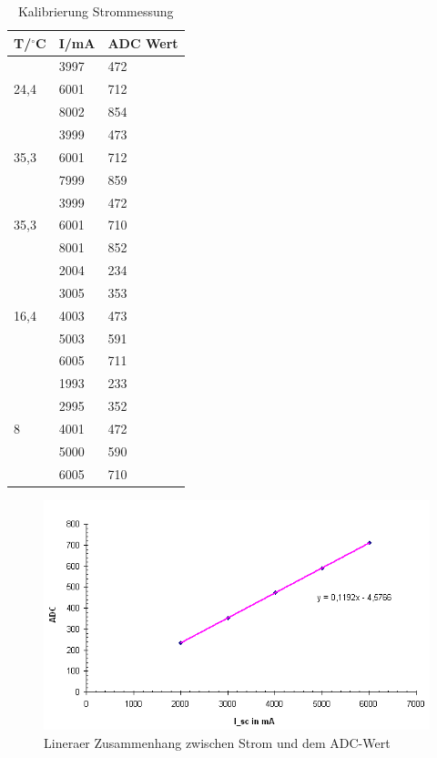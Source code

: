 \documentclass[a4paper,bibtotoc,oneside]{scrbook}
\begin{document}
\begin{table}[htbp]
\centering
\begin{tabular}{|l|l|l|}
\hline
T/$^{\circ}$C & I/mA & ADC Wert \\ 
\hline
\hline

\multirow{3}{*}{24,4} & 3997 & 472 \\
 & 6001 & 712 \\
 & 8002 & 854 \\ \hline
\multirow{3}{*}{35,3} & 3999 & 473 \\
 & 6001 & 712 \\
 & 7999 & 859 \\ \hline
\multirow{3}{*}{35,3} & 3999 & 472 \\
 & 6001 & 710 \\
 & 8001 & 852 \\ \hline
\multirow{5}{*}{16,4} & 2004 & 234 \\
 & 3005 & 353 \\
 & 4003 & 473 \\
 & 5003 & 591 \\
 & 6005 & 711 \\ \hline
\multirow{5}{*}{8} & 1993 & 233 \\
 & 2995 & 352 \\
 & 4001 & 472 \\
 & 5000 & 590 \\
 & 6005 & 710 \\ \hline
\end{tabular}
\caption{Kalibrierung Strommessung}\label{TabS}
\end{table}

\begin{figure}[htbp]
\centering
\includegraphics[width=150mm]{img/16grad.png}
\caption{Lineraer Zusammenhang zwischen Strom und dem ADC-Wert}\label{ical}
\end{figure}
\end{document}
